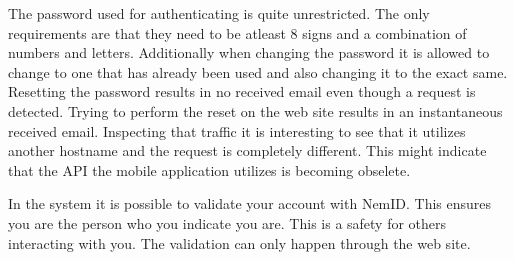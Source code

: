 The password used for authenticating is quite unrestricted. The only requirements are that they need to be atleast 8 signs and a combination of numbers and letters. Additionally when changing the password it is allowed to change to one that has already been used and also changing it to the exact same. Resetting the password results in no received email even though a request is detected. Trying to perform the reset on the web site results in an instantaneous received email. Inspecting that traffic it is interesting to see that it utilizes another hostname and the request is completely different. This might indicate that the API the mobile application utilizes is becoming obselete.     

In the system it is possible to validate your account with NemID. This ensures you are the person who you indicate you are. This is a safety for others interacting with you. The validation can only happen through the web site. 

